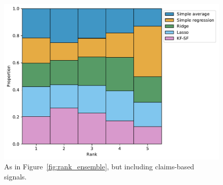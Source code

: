 \documentclass[sts]{imsart}
\theoremstyle{plain}
\theoremstyle{definition}
\theoremstyle{remark}
\begin{document}
\begin{appendix}
\begin{figure}[tb]
\centering
\includegraphics[width=0.975\linewidth]{./figures/rankplot_fusion_claims.pdf}
\caption{As in Figure~\ref{fig:rank_ensemble}, but including claims-based
  signals.} 
\label{fig:rank_ensemble_claims}
\end{figure}





\end{appendix}
\end{document}
